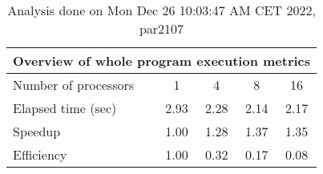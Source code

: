 \begin{table}[h]
\begin{center}
\begin{tabular}{|l|c|c|c|c|}
\hline
\multicolumn{5}{|c|}{Overview of whole program execution metrics} \\
\hline
\hline
Number of processors & 1 & 4 & 8 & 16 \\
\hline
Elapsed time (sec)      &       2.93 &       2.28 &       2.14 &       2.17 \\
\hline
Speedup                 &       1.00 &       1.28 &       1.37 &       1.35 \\
\hline
Efficiency              &       1.00 &       0.32 &       0.17 &       0.08 \\
\hline
\end{tabular}
\end{center}
\caption{ Analysis done on Mon Dec 26 10:03:47 AM CET 2022, par2107}
\end{table}
